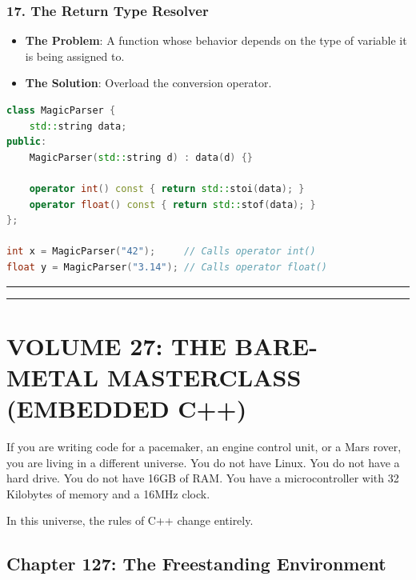 \hypertarget{the-return-type-resolver}{%
\subsubsection{17. The Return Type
Resolver}\label{the-return-type-resolver}}

\begin{itemize}
\tightlist
\item
  \textbf{The Problem}: A function whose behavior depends on the type of
  variable it is being assigned to.
\item
  \textbf{The Solution}: Overload the conversion operator.
\end{itemize}

\begin{lstlisting}[language={C++}]
class MagicParser {
    std::string data;
public:
    MagicParser(std::string d) : data(d) {}

    operator int() const { return std::stoi(data); }
    operator float() const { return std::stof(data); }
};

int x = MagicParser("42");     // Calls operator int()
float y = MagicParser("3.14"); // Calls operator float()
\end{lstlisting}

\begin{center}\rule{0.5\linewidth}{0.5pt}\end{center}

\begin{center}\rule{0.5\linewidth}{0.5pt}\end{center}

\hypertarget{volume-27-the-bare-metal-masterclass-embedded-c}{%
\section{VOLUME 27: THE BARE-METAL MASTERCLASS (EMBEDDED
C++)}\label{volume-27-the-bare-metal-masterclass-embedded-c}}

If you are writing code for a pacemaker, an engine control unit, or a
Mars rover, you are living in a different universe. You do not have
Linux. You do not have a hard drive. You do not have 16GB of RAM. You
have a microcontroller with 32 Kilobytes of memory and a 16MHz clock.

In this universe, the rules of C++ change entirely.

\hypertarget{chapter-127-the-freestanding-environment}{%
\subsection{Chapter 127: The Freestanding
Environment}\label{chapter-127-the-freestanding-environment}}

